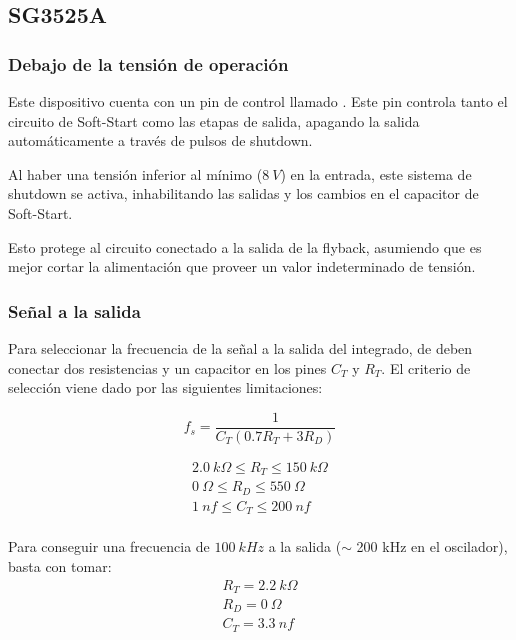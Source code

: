 %
%
%

\subsection{SG3525A}

\subsubsection{Debajo de la tensión de operación}

Este dispositivo cuenta con un pin de control llamado . Este pin controla tanto el circuito de Soft-Start como las etapas de salida, apagando la salida automáticamente a través de pulsos de shutdown.

Al haber una tensión inferior al mínimo ($8 \ V$) en la entrada, este sistema de shutdown se activa, inhabilitando las salidas y los cambios en el capacitor de Soft-Start.

Esto protege al circuito conectado a la salida de la flyback, asumiendo que es mejor cortar la alimentación que proveer un valor indeterminado de tensión.

\subsubsection{Señal a la salida}

Para seleccionar la frecuencia de la señal a la salida del integrado, de deben conectar dos resistencias y un capacitor en los pines $C_T$ y $R_T$. El criterio de selección viene dado por las siguientes limitaciones:

\begin{equation}
	f_s = \frac{1}{C_T \left( 0.7 R_T + 3 R_D \right)}
\end{equation}

\begin{equation*}
\begin{gathered}
2.0 \ k\Omega \leqslant R_T \leqslant 150 \ k\Omega \\
0 \ \Omega \leqslant R_D \leqslant 550 \ \Omega \\
1 \ nf \leqslant C_T \leqslant 200 \ nf \\
\end{gathered}
\end{equation*}

Para conseguir una frecuencia de $100 \ kHz$ a la salida ($\sim$ 200 kHz en el oscilador), basta con tomar:
\begin{equation}
\begin{gathered}
R_T = 2.2 \ k\Omega \\
R_D = 0 \ \Omega \\
C_T = 3.3 \ nf \\
\end{gathered}
\end{equation}

